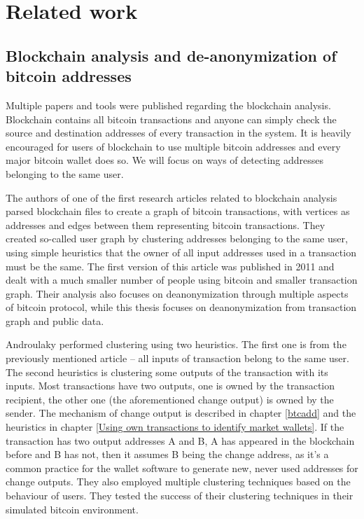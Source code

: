\documentclass[
  digital, %
  table,   %
  lof,     %
  lot,     %
  oneside
]{fithesis3}
\begin{document}
\chapter{Related work}
\label{relw}
\section{Blockchain analysis and de-anonymization of bitcoin addresses}

Multiple papers and tools were published regarding the blockchain analysis.
Blockchain contains all bitcoin transactions and anyone can simply check
the source and destination addresses of every transaction in the system.
It is heavily encouraged for users of blockchain to use multiple bitcoin addresses
 and every major bitcoin wallet does so.
 We will focus on ways of detecting addresses belonging to the same user.
 
The authors of one \cite{reid2013analysis} of the first research articles related to blockchain analysis
 parsed blockchain files to create a graph of bitcoin transactions, with vertices as addresses
and edges between them representing bitcoin transactions.
 They created so-called user graph by clustering addresses belonging to the same user, using simple heuristics that the owner of all input addresses used in a transaction must be the same. The first version of this article was published in 2011 and dealt with a much smaller number of people using bitcoin and smaller transaction graph.
Their analysis also focuses on deanonymization through multiple aspects of bitcoin protocol,
while this thesis focuses on deanonymization from transaction graph and public data.

Androulaky \cite{androulaki2013evaluating} performed clustering using two heuristics.
The first one is from the previously mentioned article \cite{reid2013analysis} -- all inputs of transaction
belong to the same user. The second heuristics is clustering some outputs of the transaction with its inputs.
Most transactions have two outputs, one is owned by the transaction recipient,
the other one (the aforementioned change output) is owned by
the sender. The mechanism of change output is described in chapter \ref{btcadd} and the heuristics in
chapter \ref{Using own transactions to identify market wallets}.
If the transaction has two output addresses A and B, A has appeared in the blockchain
before and B has not, then it assumes B being the change address, as it's a common practice
for the wallet software to generate new, never used addresses for change outputs.
They also employed multiple clustering techniques based on the behaviour of users.
 They tested the success of their clustering techniques in their simulated bitcoin 
 environment.
\end{document}
